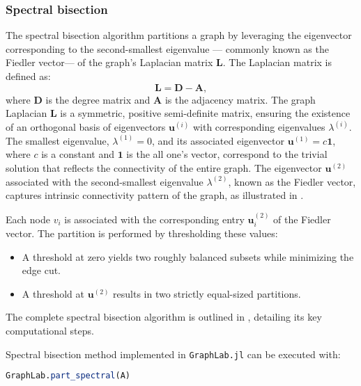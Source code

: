 \documentclass[../paper.tex]{subfiles}
\begin{document}
    \subsubsection{Spectral bisection}\label{sub:spec} The spectral bisection algorithm partitions a graph
    by leveraging the eigenvector corresponding to the second-smallest eigenvalue
    --- commonly known as the Fiedler vector--- of the graph's Laplacian matrix $\mathbf{L}$.
    The Laplacian matrix is defined as:
    \begin{equation}
        \mathbf{L} = \mathbf{D}-\mathbf{A},
    \end{equation}
    where $\mathbf{D}$ is the degree matrix and $\mathbf{A}$ is the adjacency matrix.
    The graph Laplacian $\mathbf{L}$ is a symmetric, positive semi-definite matrix, ensuring the existence of an orthogonal basis of eigenvectors $\mathbf{u}^{(i)}$ with corresponding eigenvalues
    $\lambda^{(i)}$.
    The smallest eigenvalue, $\lambda^{(1)} = 0$, and its associated eigenvector
    $\mathbf{u}^{(1)} = c\mathbf{1}$, where $c$ is a constant and $\mathbf{1}$ is the all one’s vector, correspond to the trivial solution that reflects the connectivity of
    the entire graph.
    The eigenvector $\mathbf{u}^{(2)}$
    associated with the second-smallest eigenvalue $\lambda^{(2)}$, known as the Fiedler vector\cite{fiedler75}, captures intrinsic connectivity pattern of the graph, as illustrated in .
    
    Each node $v_i$ is associated with the corresponding entry $\mathbf{u}^{(2)}_i$ of the Fiedler vector. The partition is performed by thresholding these values:
    \begin{itemize}
        \item A threshold at zero yields two roughly balanced subsets while minimizing the edge cut.
        \item A threshold at $\mathbf{u}^{(2)}$ results in two strictly equal-sized partitions.
    \end{itemize}
    The complete spectral bisection algorithm is outlined in , detailing its key computational steps.
    
    
    
    

    Spectral bisection method implemented in \texttt{GraphLab.jl} can be executed with:

    \begin{lstlisting}[language=Julia]
    GraphLab.part_spectral(A)
    \end{lstlisting}
\end{document}
